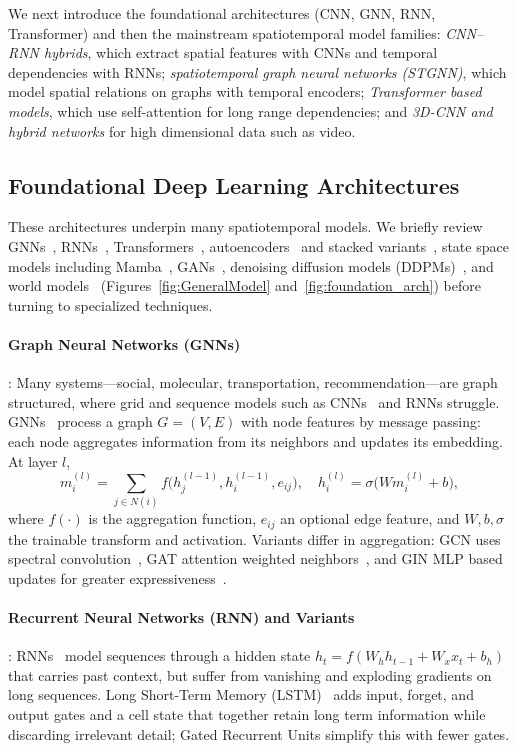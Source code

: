\documentclass[journal]{IEEEtran}
\begin{document}
We next introduce the foundational architectures (CNN, GNN, RNN, Transformer) and then the mainstream spatiotemporal model families: \emph{CNN--RNN hybrids}, which extract spatial features with CNNs and temporal dependencies with RNNs; \emph{spatiotemporal graph neural networks (STGNN)}, which model spatial relations on graphs with temporal encoders; \emph{Transformer based models}, which use self-attention for long range dependencies; and \emph{3D-CNN and hybrid networks} for high dimensional data such as video.


\subsection{Foundational Deep Learning Architectures }
These architectures underpin many spatiotemporal models. We briefly review GNNs~\cite{scarselli2009gnn}, RNNs~\cite{rumelhart1986rnn}, Transformers~\cite{vaswani2017attention}, autoencoders~\cite{hinton2006reducing} and stacked variants~\cite{masci2011stacked}, state space models including Mamba~\cite{gu2023mamba}, GANs~\cite{goodfellow2014gan}, denoising diffusion models (DDPMs)~\cite{ho2020ddpm}, and world models~\cite{maes2026leworldmodel} (Figures~\ref{fig:GeneralModel} and~\ref{fig:foundation_arch}) before turning to specialized techniques.


\paragraph{Graph Neural Networks (GNNs)}: Many systems---social, molecular, transportation, recommendation---are graph structured, where grid and sequence models such as CNNs~\cite{lecun1998cnn} and RNNs struggle. GNNs~\cite{scarselli2009gnn} process a graph $G=(V,E)$ with node features by message passing: each node aggregates information from its neighbors and updates its embedding. At layer $l$,
\begin{equation}
m_i^{(l)} = \sum_{j \in N(i)} f\bigl(h_j^{(l-1)}, h_i^{(l-1)}, e_{ij}\bigr), \quad h_i^{(l)} = \sigma\bigl(W m_i^{(l)} + b\bigr),
\end{equation}
where $f(\cdot)$ is the aggregation function, $e_{ij}$ an optional edge feature, and $W,b,\sigma$ the trainable transform and activation. Variants differ in aggregation: GCN uses spectral convolution~\cite{kipf2017gcn}, GAT attention weighted neighbors~\cite{velickovic2018gat}, and GIN MLP based updates for greater expressiveness~\cite{xu2019gin}.

\paragraph{Recurrent Neural Networks (RNN) and Variants}: RNNs~\cite{rumelhart1986rnn} model sequences through a hidden state $h_t = f(W_h h_{t-1} + W_x x_t + b_h)$ that carries past context, but suffer from vanishing and exploding gradients on long sequences. Long Short-Term Memory (LSTM)~\cite{rnn_lstm} adds input, forget, and output gates and a cell state that together retain long term information while discarding irrelevant detail; Gated Recurrent Units simplify this with fewer gates.
\end{document}

